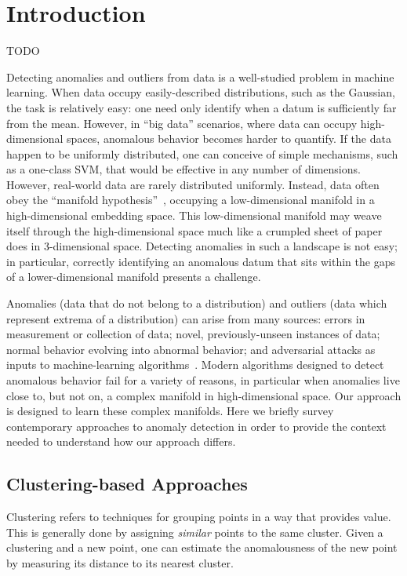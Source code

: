 \section{Introduction}
\label{sec:introduction}

TODO

Detecting anomalies and outliers from data is a well-studied problem in machine learning.
When data occupy easily-described distributions, such as the Gaussian, the task is relatively easy: one need only identify when a datum is sufficiently far from the mean.
However, in ``big data'' scenarios, where data can occupy high-dimensional spaces, anomalous behavior becomes harder to quantify.
If the data happen to be uniformly distributed, one can conceive of simple mechanisms, such as a one-class SVM, that would be effective in any number of dimensions.
However, real-world data are rarely distributed uniformly.
Instead, data often obey the ``manifold hypothesis''~\cite{fefferman2016testing}, occupying a low-dimensional manifold in a high-dimensional embedding space.
This low-dimensional manifold may weave itself through the high-dimensional space much like a crumpled sheet of paper does in 3-dimensional space.
Detecting anomalies in such a landscape is not easy;
in particular, correctly identifying an anomalous datum that sits within the gaps of a lower-dimensional manifold presents a challenge.

Anomalies (data that do not belong to a distribution) and outliers (data which represent extrema of a distribution) can arise from many sources:
errors in measurement or collection of data;
novel, previously-unseen instances of data;
normal behavior evolving into abnormal behavior;
and adversarial attacks as inputs to machine-learning algorithms~\cite{elsayed2018adversarial}.
Modern algorithms designed to detect anomalous behavior fail for a variety of reasons, in particular when anomalies live close to, but not on, a complex manifold in high-dimensional space.
Our approach is designed to learn these complex manifolds.
Here we briefly survey contemporary approaches to anomaly detection in order to provide the context needed to understand how our approach differs.

\subsection{Clustering-based Approaches}
\label{subsec:related-works:clustering-based-approaches}

Clustering refers to techniques for grouping points in a way that provides value.
This is generally done by assigning \textit{similar} points to the same cluster.
Given a clustering and a new point, one can estimate the anomalousness of the new point by measuring its distance to its nearest cluster.

